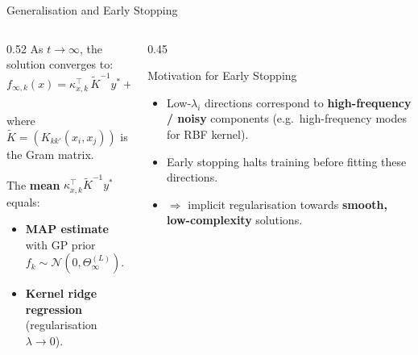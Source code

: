 \documentclass[aspectratio=169, 10pt]{beamer}
\newcommand{\NTK}{\Theta^{(L)}_\infty}
\newcommand{\highlight}[1]{\textcolor{blue!70!black}{\textbf{#1}}}
\newcommand{\myalert}[1]{\textcolor{red!70!black}{\textbf{#1}}}
\begin{document}
\begin{frame}{Generalisation and Early Stopping}
  \begin{columns}[T]
    \begin{column}{0.52\textwidth}
      As $t\to\infty$, the solution converges to:
      \[
        f_{\infty,k}(x) = \kappa^\top_{x,k}\,\tilde K^{-1} y^* + \underbrace{\left(f_{0}(x) - \kappa^\top_{x,k}\tilde K^{-1}y_0\right)}_{\text{centred Gaussian, zero on data}},
      \]
      where $\tilde K = (K_{kk'}(x_i,x_j))$ is the Gram matrix.

      \vspace{0.4em}
      The \textbf{mean} $\kappa^\top_{x,k}\tilde K^{-1}y^*$ equals:
      \begin{itemize}
        \item \textbf{MAP estimate} with GP prior $f_k\sim\mathcal{N}(0,\NTK)$.
        \item \textbf{Kernel ridge regression} (regularisation $\lambda\to 0$).
      \end{itemize}
    \end{column}
    \begin{column}{0.45\textwidth}
      \begin{block}{Motivation for Early Stopping}
        \begin{itemize}
          \item Low-$\lambda_i$ directions correspond to \myalert{high-frequency / noisy} components (e.g.\ high-frequency modes for RBF kernel).
          \item Early stopping halts training before fitting these directions.
          \item $\Rightarrow$ implicit regularisation towards \highlight{smooth, low-complexity} solutions.
        \end{itemize}
      \end{block}
    \end{column}
  \end{columns}
\end{frame}
\end{document}
